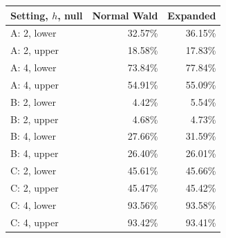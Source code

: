 \begin{tabular}{@{}lrr@{}}
\toprule
Setting, \(h\), null & Normal Wald & Expanded\\
\midrule
A: 2, lower & 32.57\% & 36.15\%\\
A: 2, upper & 18.58\% & 17.83\%\\
A: 4, lower & 73.84\% & 77.84\%\\
A: 4, upper & 54.91\% & 55.09\%\\
B: 2, lower & 4.42\% & 5.54\%\\
B: 2, upper & 4.68\% & 4.73\%\\
B: 4, lower & 27.66\% & 31.59\%\\
B: 4, upper & 26.40\% & 26.01\%\\
C: 2, lower & 45.61\% & 45.66\%\\
C: 2, upper & 45.47\% & 45.42\%\\
C: 4, lower & 93.56\% & 93.58\%\\
C: 4, upper & 93.42\% & 93.41\%\\
\bottomrule
\end{tabular}
